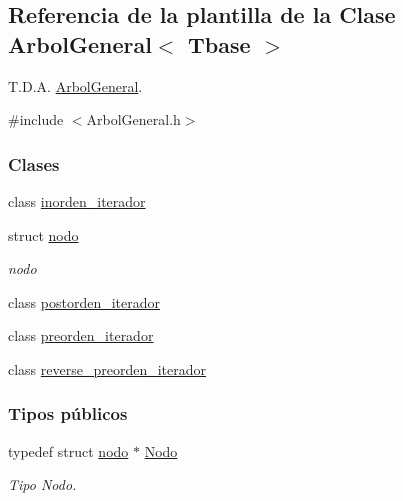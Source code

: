 \hypertarget{classArbolGeneral}{}\subsection{Referencia de la plantilla de la Clase Arbol\+General$<$ Tbase $>$}
\label{classArbolGeneral}


T.\+D.\+A. \hyperlink{classArbolGeneral}{Arbol\+General}.  




{\ttfamily \#include $<$Arbol\+General.\+h$>$}

\subsubsection*{Clases}
\begin{DoxyCompactItemize}
\item 
class \hyperlink{classArbolGeneral_1_1inorden__iterador}{inorden\+\_\+iterador}
\item 
struct \hyperlink{structArbolGeneral_1_1nodo}{nodo}
\begin{DoxyCompactList}\small\item\em nodo \end{DoxyCompactList}\item 
class \hyperlink{classArbolGeneral_1_1postorden__iterador}{postorden\+\_\+iterador}
\item 
class \hyperlink{classArbolGeneral_1_1preorden__iterador}{preorden\+\_\+iterador}
\item 
class \hyperlink{classArbolGeneral_1_1reverse__preorden__iterador}{reverse\+\_\+preorden\+\_\+iterador}
\end{DoxyCompactItemize}
\subsubsection*{Tipos públicos}
\begin{DoxyCompactItemize}
\item 
typedef struct \hyperlink{structArbolGeneral_1_1nodo}{nodo} $\ast$ \hyperlink{classArbolGeneral_a12cc1b74a9095d89bc7334290d332f7a}{Nodo}
\begin{DoxyCompactList}\small\item\em Tipo Nodo. \end{DoxyCompactList}\end{DoxyCompactItemize}
